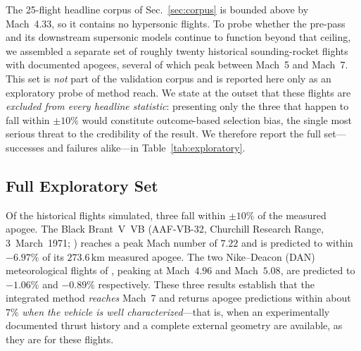 
The 25-flight headline corpus of Sec.~\ref{sec:corpus} is bounded above by Mach~4.33, so it
contains no hypersonic flights. To probe whether the pre-pass and its downstream
supersonic models continue to function beyond that ceiling, we assembled a
separate set of roughly twenty historical sounding-rocket flights with
documented apogees, several of which peak between Mach~5 and Mach~7. This set is
\emph{not} part of the validation corpus and is reported here only as an
exploratory probe of method reach. We state at the outset that these flights are
\emph{excluded from every headline statistic}: presenting only the three that
happen to fall within $\pm10\%$ would constitute outcome-based selection bias,
the single most serious threat to the credibility of the result. We therefore
report the full set---successes and failures alike---in Table~\ref{tab:exploratory}.

\subsection{Full Exploratory Set}

Of the historical flights simulated, three fall within $\pm10\%$ of the measured
apogee. The Black Brant~V~VB (AAF-VB-32, Churchill Research Range, 3~March~1971;
\cite{dtic_ad0733141}) reaches a peak Mach number of $7.22$ and is predicted to
within $-6.97\%$ of its $273.6\,\mathrm{km}$ measured apogee. The two
Nike--Deacon (DAN) meteorological flights of \cite{heitkotter1956}, peaking at
Mach~$4.96$ and Mach~$5.08$, are predicted to $-1.06\%$ and $-0.89\%$
respectively. These three results establish that the integrated method
\emph{reaches} Mach~7 and returns apogee predictions within about $7\%$
\emph{when the vehicle is well characterized}---that is, when an experimentally
documented thrust history and a complete external geometry are available, as they
are for these flights.

